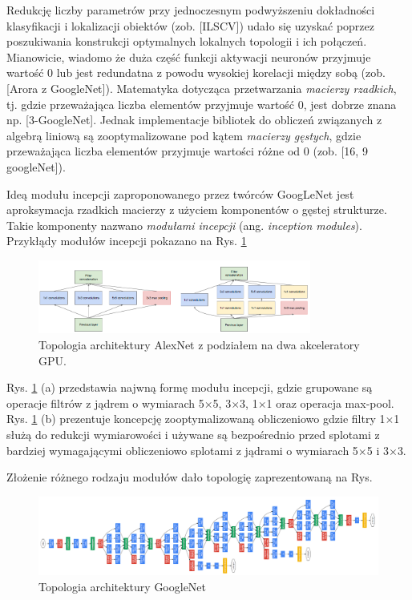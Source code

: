 Redukcję liczby parametrów przy jednoczesnym podwyższeniu dokładności klasyfikacji i lokalizacji obiektów (zob. [ILSCV]) udało się uzyskać poprzez poszukiwania konstrukcji optymalnych lokalnych topologii i ich połączeń. Mianowicie, wiadomo że duża część funkcji aktywacji neuronów przyjmuje wartość 0 lub jest redundatna z powodu wysokiej korelacji między sobą (zob. [Arora z GoogleNet]). Matematyka dotycząca przetwarzania \textit{macierzy rzadkich}, tj. gdzie przeważająca liczba elementów przyjmuje wartość 0, jest dobrze znana np. [3-GoogleNet]. Jednak implementacje bibliotek do obliczeń związanych z algebrą liniową są zooptymalizowane pod kątem \textit{macierzy gęstych}, gdzie przeważająca liczba elementów przyjmuje wartości różne od 0 (zob. [16, 9 googleNet]). 

Ideą modułu incepcji zaproponowanego przez twórców GoogLeNet jest aproksymacja rzadkich macierzy z użyciem komponentów o gęstej strukturze. Takie komponenty nazwano \textit{modułami incepcji} (ang. \textit{inception modules}). Przykłądy modułów incepcji pokazano na Rys. \ref{GoogleNetInceptionModules} 
\begin{figure}[h!]
	\centering
	\includegraphics[width=0.8\textwidth]{figures/InceptionModules.png}
	\caption{Topologia architektury AlexNet z podziałem na dwa akceleratory GPU.}
	\label{GoogleNetInceptionModules}
\end{figure}

Rys. \ref{GoogleNetInceptionModules} (a) przedstawia najwną formę modułu incepcji, gdzie grupowane są operacje filtrów z jądrem o wymiarach 5$\times$5, 3$\times$3, 1$\times$1 oraz operacja max-pool. Rys. \ref{GoogleNetInceptionModules} (b) prezentuje koncepcję zooptymalizowaną obliczeniowo gdzie filtry 1$\times$1 służą do redukcji wymiarowości i używane są bezpośrednio przed splotami z bardziej wymagającymi obliczeniowo splotami z jądrami o wymiarach 5$\times$5 i 3$\times$3. 

Złożenie różnego rodzaju modułów dało topologię zaprezentowaną na Rys.
\begin{figure}[h!]
	\centering
	\includegraphics[width=1\textwidth]{figures/GoogleNet.png}
	\caption{Topologia architektury GoogleNet}
	\label{GoogleNetTopo}
\end{figure}

